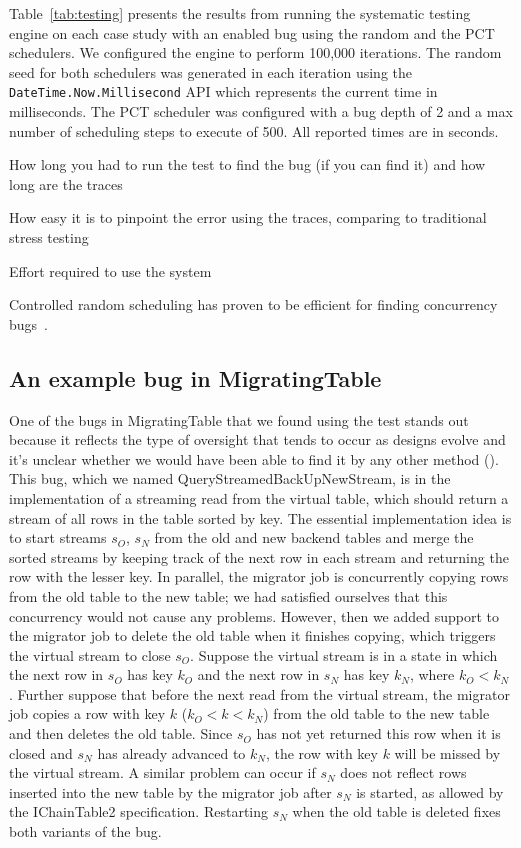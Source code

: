 Table~\ref{tab:testing} presents the results from running the \psharp systematic testing engine on each case study with an enabled bug using the random and the PCT schedulers. We configured the engine to perform 100,000 iterations. The random seed for both schedulers was generated in each iteration using the \texttt{DateTime.Now.Millisecond} API which represents the current time in milliseconds. The PCT scheduler was configured with a bug depth of 2 and a max number of scheduling steps to execute of 500. All reported times are in seconds.

How long you had to run the test to find the bug (if you can find it) and how long are the traces

How easy it is to pinpoint the error using the \psharp traces, comparing to traditional stress testing

Effort required to use the system

Controlled random scheduling has proven to be efficient for finding concurrency bugs~\cite{thomson2014sct, deligiannis2015psharp}.

\subsection{An example bug in MigratingTable}

One of the bugs in MigratingTable that we found using the \psharp test stands out because it reflects the type of oversight that tends to occur as designs evolve and it's unclear whether we would have been able to find it by any other method ().  This bug, which we named QueryStreamedBackUpNewStream, is in the implementation of a streaming read from the virtual table, which should return a stream of all rows in the table sorted by key.  The essential implementation idea is to start streams $s_O$, $s_N$ from the old and new backend tables and merge the sorted streams by keeping track of the next row in each stream and returning the row with the lesser key.  In parallel, the migrator job is concurrently copying rows from the old table to the new table; we had satisfied ourselves that this concurrency would not cause any problems.  However, then we added support to the migrator job to delete the old table when it finishes copying, which triggers the virtual stream to close $s_O$.  Suppose the virtual stream is in a state in which the next row in $s_O$ has key $k_O$ and the next row in $s_N$ has key $k_N$, where $k_O < k_N$.  Further suppose that before the next read from the virtual stream, the migrator job copies a row with key $k$ ($k_O < k < k_N$) from the old table to the new table and then deletes the old table.  Since $s_O$ has not yet returned this row when it is closed and $s_N$ has already advanced to $k_N$, the row with key $k$ will be missed by the virtual stream.  A similar problem can occur if $s_N$ does not reflect rows inserted into the new table by the migrator job after $s_N$ is started, as allowed by the IChainTable2 specification.  Restarting $s_N$ when the old table is deleted fixes both variants of the bug.

